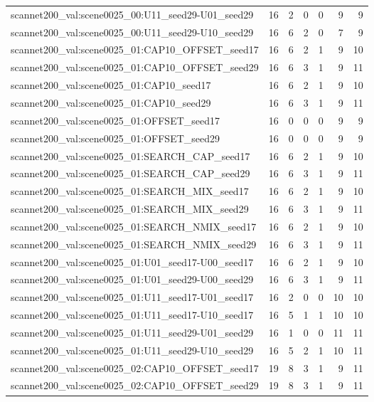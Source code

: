 \begin{table}[t]
\begin{tabular}{lrrrrrr}
scannet200\_val:scene0025\_00:U11\_seed29-U01\_seed29 & 16 & 2 & 0 & 0 & 9 & 9 \\
scannet200\_val:scene0025\_00:U11\_seed29-U10\_seed29 & 16 & 6 & 2 & 0 & 7 & 9 \\
scannet200\_val:scene0025\_01:CAP10\_OFFSET\_seed17 & 16 & 6 & 2 & 1 & 9 & 10 \\
scannet200\_val:scene0025\_01:CAP10\_OFFSET\_seed29 & 16 & 6 & 3 & 1 & 9 & 11 \\
scannet200\_val:scene0025\_01:CAP10\_seed17 & 16 & 6 & 2 & 1 & 9 & 10 \\
scannet200\_val:scene0025\_01:CAP10\_seed29 & 16 & 6 & 3 & 1 & 9 & 11 \\
scannet200\_val:scene0025\_01:OFFSET\_seed17 & 16 & 0 & 0 & 0 & 9 & 9 \\
scannet200\_val:scene0025\_01:OFFSET\_seed29 & 16 & 0 & 0 & 0 & 9 & 9 \\
scannet200\_val:scene0025\_01:SEARCH\_CAP\_seed17 & 16 & 6 & 2 & 1 & 9 & 10 \\
scannet200\_val:scene0025\_01:SEARCH\_CAP\_seed29 & 16 & 6 & 3 & 1 & 9 & 11 \\
scannet200\_val:scene0025\_01:SEARCH\_MIX\_seed17 & 16 & 6 & 2 & 1 & 9 & 10 \\
scannet200\_val:scene0025\_01:SEARCH\_MIX\_seed29 & 16 & 6 & 3 & 1 & 9 & 11 \\
scannet200\_val:scene0025\_01:SEARCH\_NMIX\_seed17 & 16 & 6 & 2 & 1 & 9 & 10 \\
scannet200\_val:scene0025\_01:SEARCH\_NMIX\_seed29 & 16 & 6 & 3 & 1 & 9 & 11 \\
scannet200\_val:scene0025\_01:U01\_seed17-U00\_seed17 & 16 & 6 & 2 & 1 & 9 & 10 \\
scannet200\_val:scene0025\_01:U01\_seed29-U00\_seed29 & 16 & 6 & 3 & 1 & 9 & 11 \\
scannet200\_val:scene0025\_01:U11\_seed17-U01\_seed17 & 16 & 2 & 0 & 0 & 10 & 10 \\
scannet200\_val:scene0025\_01:U11\_seed17-U10\_seed17 & 16 & 5 & 1 & 1 & 10 & 10 \\
scannet200\_val:scene0025\_01:U11\_seed29-U01\_seed29 & 16 & 1 & 0 & 0 & 11 & 11 \\
scannet200\_val:scene0025\_01:U11\_seed29-U10\_seed29 & 16 & 5 & 2 & 1 & 10 & 11 \\
scannet200\_val:scene0025\_02:CAP10\_OFFSET\_seed17 & 19 & 8 & 3 & 1 & 9 & 11 \\
scannet200\_val:scene0025\_02:CAP10\_OFFSET\_seed29 & 19 & 8 & 3 & 1 & 9 & 11 \\

\end{tabular}
\end{table}
